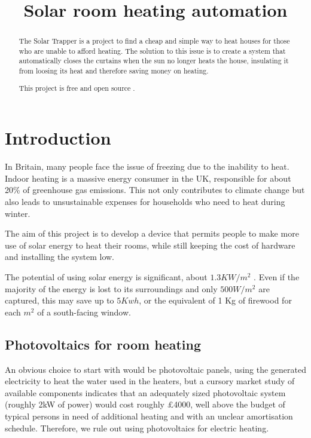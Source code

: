 \documentclass[a4paper,12pt]{article}
\title{Solar room heating automation}
\begin{document}
\maketitle
\begin{abstract}
    The Solar Trapper is a project to find a cheap and simple way to heat houses for those who are unable to afford heating. 
    The solution to this issue is to create a system that automatically closes the curtains when the sun no longer heats the house, 
    insulating it from loosing its heat and therefore saving money on heating.

    This project is free and open source \cite{url:repo}.
\end{abstract}
\tableofcontents
\section{Introduction}

In Britain, many people face the issue of freezing due to the inability to heat. 
Indoor heating is a massive energy consumer in the UK, responsible for about 20\% of greenhouse gas emissions\cite{url:energyUse}. 
This not only contributes to climate change but also leads to unsustainable expenses for households who need to heat during winter.

The aim of this project is to develop a device that permits people to make more use of solar energy to heat their rooms, 
while still keeping the cost of hardware and installing the system low. 

The potential of using solar energy is significant, about $1.3 KW/m^2$ \cite{url:solarConstant}. 
Even if the majority of the energy is lost to its surroundings and only $500 W/m^2$ are captured, 
this may save up to $5 Kwh$, or the equivalent of 1 Kg of firewood for each $m^2$ of a south-facing window. 

\subsection{Photovoltaics for room heating}

An obvious choice to start with would be photovoltaic panels, using the generated electricity to heat the water used in the heaters, 
but a cursory market study of available components indicates that an adequately sized photovoltaic system (roughly 2kW of power) 
would cost roughly £4000\cite{url:solarEnergyStore}, well above the budget of typical persons in need of additional heating  
and with an unclear amortisation schedule. 
Therefore, we rule out using photovoltaics for electric heating.
\end{document}
